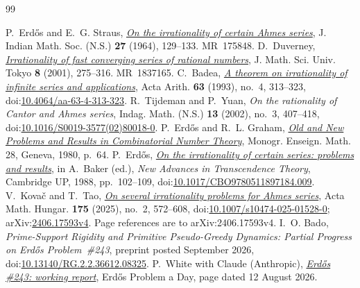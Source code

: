 \begin{thebibliography}{99}
\small
\raggedright
\setlength{\itemsep}{1pt}
 P.~Erd\H{o}s and E.~G. Straus,
  \href{https://users.renyi.hu/~p_erdos/1964-19.pdf}{\emph{On the irrationality
  of certain Ahmes series}},
  J. Indian Math. Soc. (N.S.) \textbf{27} (1964), 129--133. MR~175848.
 D.~Duverney,
  \href{https://www.ms.u-tokyo.ac.jp/journal/pdf/jms080206.pdf}
  {\emph{Irrationality of fast converging series of rational numbers}},
  J. Math. Sci. Univ. Tokyo \textbf{8} (2001), 275--316. MR~1837165.
 C.~Badea,
  \href{https://matwbn.icm.edu.pl/ksiazki/aa/aa63/aa6342.pdf}{\emph{A theorem
  on irrationality of infinite series and applications}}, Acta Arith.
  \textbf{63} (1993), no.~4, 313--323,
  doi:\href{https://doi.org/10.4064/aa-63-4-313-323}{10.4064/aa-63-4-313-323}.
 R.~Tijdeman and P.~Yuan,
  \emph{On the rationality of Cantor and Ahmes series},
  Indag. Math. (N.S.) \textbf{13} (2002), no.~3, 407--418,
  doi:\href{https://doi.org/10.1016/S0019-3577(02)80018-0}{10.1016/S0019-3577(02)80018-0}.
 P.~Erd\H{o}s and R.~L. Graham,
  \href{https://mathweb.ucsd.edu/~ronspubs/80_11_number_theory.pdf}{\emph{Old
  and New Problems and Results in Combinatorial Number Theory}},
  Monogr. Enseign. Math. 28, Geneva, 1980, p.~64.
 P.~Erd\H{o}s,
  \href{https://users.renyi.hu/~p_erdos/1988-22.pdf}{\emph{On the irrationality
  of certain series: problems and results}}, in A.~Baker (ed.), \emph{New
  Advances in Transcendence Theory}, Cambridge UP, 1988, pp.~102--109,
  doi:\href{https://doi.org/10.1017/CBO9780511897184.009}{10.1017/CBO9780511897184.009}.
 V.~Kova\v{c} and T.~Tao,
  \href{https://arxiv.org/abs/2406.17593v4}{\emph{On several irrationality
  problems for Ahmes series}}, Acta Math. Hungar. \textbf{175} (2025), no.~2,
  572--608,
  doi:\href{https://doi.org/10.1007/s10474-025-01528-0}{10.1007/s10474-025-01528-0};
  arXiv:\href{https://arxiv.org/abs/2406.17593v4}{2406.17593v4}.
  Page references are to arXiv:2406.17593v4.
 I.~O. Bado,
  \emph{Prime-Support Rigidity and Primitive Pseudo-Greedy Dynamics:
  Partial Progress on Erd\H{o}s Problem~\#243}, preprint posted September 2026,
  doi:\href{https://doi.org/10.13140/RG.2.2.36612.08325}
  {10.13140/RG.2.2.36612.08325}.
 P.~White with Claude (Anthropic),
  \href{https://erdosproblemaday.com/report/243}{\emph{Erd\H{o}s \#243:
  working report}}, Erd\H{o}s Problem a Day, page dated 12 August 2026.

\end{thebibliography}
